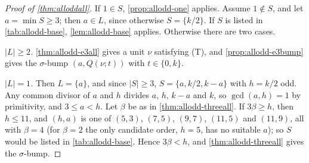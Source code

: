 \begin{proof}[Proof of \autoref{thm:alloddall}]
If $1\in S$, \autoref{prop:allodd-one} applies. Assume $1\notin S$, and let
$a=\min S\ge3$; then $a\in L$, since otherwise $S=\{k/2\}$. If $S$ is listed
in \autoref{tab:allodd-base}, \autoref{lem:allodd-base} applies. Otherwise
there are two cases.

\emph{$|L|\ge2$.} \autoref{thm:allodd-e3all} gives a unit $\nu$ satisfying
(T), and \autoref{prop:allodd-e3bump} gives the $\sigma$-bump $(a,Q(\nu;t))$
with $t\in\{0,k\}$.

\emph{$|L|=1$.} Then $L=\{a\}$, and since $|S|\ge3$, $S=\{a,k/2,k-a\}$ with
$h=k/2$ odd. Any common divisor of $a$ and $h$ divides $a$, $h$, $k-a$ and
$k$, so $\gcd(a,h)=1$ by primitivity, and $3\le a<h$. Let $\beta$ be as in
\autoref{thm:allodd-threeall}. If $3\beta\ge h$, then $h\le11$, and $(h,a)$ is
one of $(5,3)$, $(7,5)$, $(9,7)$, $(11,5)$ and $(11,9)$, all with $\beta=4$
(for $\beta=2$ the only candidate order, $h=5$, has no suitable $a$); so $S$
would be listed in \autoref{tab:allodd-base}. Hence $3\beta<h$, and
\autoref{thm:allodd-threeall} gives the $\sigma$-bump.
\end{proof}
